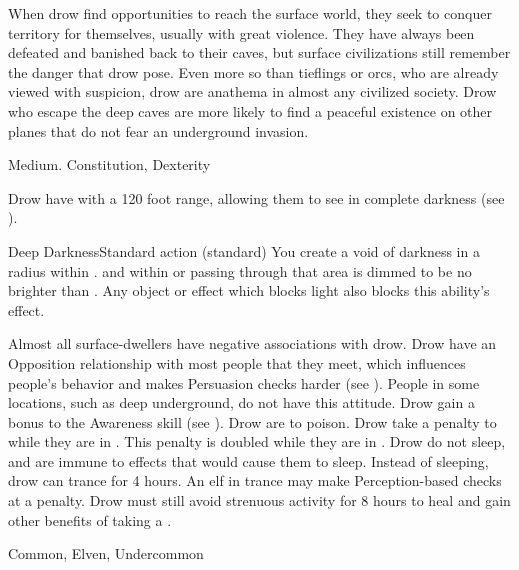   When drow find opportunities to reach the surface world, they seek to conquer territory for themselves, usually with great violence.
  They have always been defeated and banished back to their caves, but surface civilizations still remember the danger that drow pose.
  Even more so than tieflings or orcs, who are already viewed with suspicion, drow are anathema in almost any civilized society.
  Drow who escape the deep caves are more likely to find a peaceful existence on other planes that do not fear an underground invasion.

   Medium.
    Constitution,  Dexterity
  \begin{raggeditemize}
     Drow have  with a 120 foot range, allowing them to see in complete darkness (see ).
    \begin{magicalsustainability}{Deep Darkness}{Standard action}
        \abilitytags {} (standard)
        \rankline
        You create a void of darkness in a \medarea radius  within \medrange.
         and  within or passing through that area is dimmed to be no brighter than .
        Any object or effect which blocks light also blocks this ability's effect.
      \end{magicalsustainability}
     Almost all surface-dwellers have negative associations with drow.
      Drow have an Opposition relationship with most people that they meet, which influences people's behavior and makes Persuasion checks harder (see ).
      People in some locations, such as deep underground, do not have this attitude.
     Drow gain a  bonus to the Awareness skill (see ).
     Drow are \resistant to poison.
     Drow take a  penalty to  while they are in .
      This penalty is doubled while they are in .
     Drow do not sleep, and are immune to \magical effects that would cause them to sleep.
      Instead of sleeping, drow can trance for 4 hours.
      An elf in trance may make Perception-based checks at a  penalty.
      Drow must still avoid strenuous activity for 8 hours to heal and gain other benefits of taking a .
  \end{raggeditemize}
   Common, Elven, Undercommon

